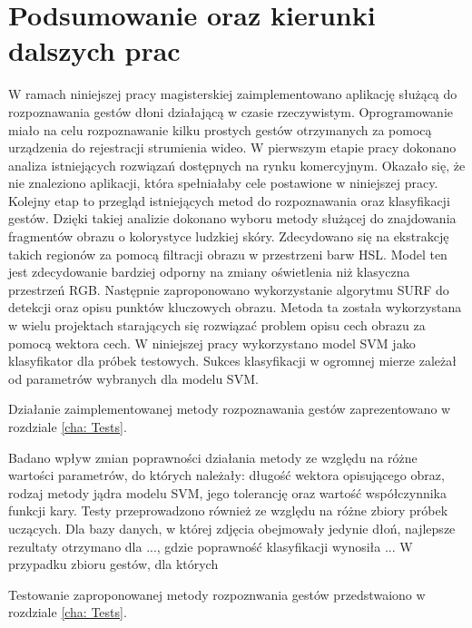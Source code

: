 \chapter{Podsumowanie oraz kierunki dalszych prac}
W ramach niniejszej pracy magisterskiej zaimplementowano aplikację służącą do rozpoznawania gestów dłoni działającą w czasie rzeczywistym. Oprogramowanie miało na celu rozpoznawanie kilku prostych gestów otrzymanych za pomocą urządzenia do rejestracji strumienia wideo. W pierwszym etapie pracy dokonano analiza istniejących rozwiązań dostępnych na rynku komercyjnym. Okazało się, że nie znaleziono aplikacji, która spełniałaby cele postawione w niniejszej pracy. Kolejny etap to przegląd istniejących metod do rozpoznawania oraz klasyfikacji gestów. Dzięki takiej analizie dokonano wyboru metody służącej do znajdowania fragmentów obrazu o kolorystyce ludzkiej skóry. Zdecydowano się na ekstrakcję takich regionów za pomocą filtracji obrazu w przestrzeni barw HSL. Model ten jest zdecydowanie bardziej odporny na zmiany oświetlenia niż klasyczna przestrzeń RGB. Następnie zaproponowano wykorzystanie algorytmu SURF do detekcji oraz opisu punktów kluczowych obrazu. Metoda ta została wykorzystana w wielu projektach starających się rozwiązać problem opisu cech obrazu za pomocą wektora cech. W niniejszej pracy wykorzystano model SVM jako klasyfikator dla próbek testowych. Sukces klasyfikacji w ogromnej mierze zależał od parametrów  wybranych dla modelu SVM.

Działanie zaimplementowanej metody rozpoznawania gestów zaprezentowano w rozdziale \ref{cha: Tests}. 

Badano wpływ zmian poprawności działania metody ze względu na różne wartości parametrów, do których należały: długość wektora opisującego obraz, rodzaj metody jądra modelu SVM, jego tolerancję oraz wartość współczynnika funkcji kary. Testy przeprowadzono również ze względu na różne zbiory próbek uczących. Dla bazy danych, w której zdjęcia obejmowały jedynie dłoń, najlepsze rezultaty otrzymano dla ..., gdzie poprawność klasyfikacji wynosiła ...  W przypadku zbioru gestów, dla których 

Testowanie zaproponowanej metody rozpoznwania gestów przedstwaiono w rozdziale \ref{cha: Tests}. 

